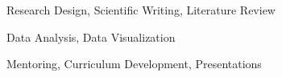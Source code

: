 \begin{cventries}
  {
    \begin{cvitems}
    \item Research Design, Scientific Writing, Literature Review
    \item Data Analysis, Data Visualization
    \item Mentoring, Curriculum Development, Presentations
    \end{cvitems}
  }

\end{cventries}
